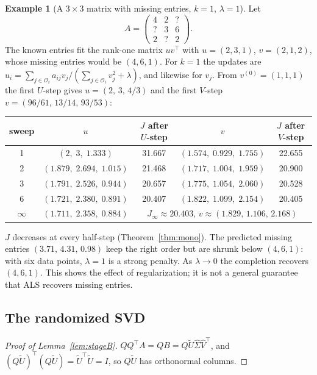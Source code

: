 \documentclass[10pt]{article}
\theoremstyle{plain}
\theoremstyle{definition}
\newtheorem{example}[theorem]{Example}
\theoremstyle{remark}
\newcommand{\T}{^{\top}}
\newcommand{\obs}{\mathcal{O}}
\begin{document}
\begin{example}[A $3\times3$ matrix with missing entries, $k=1$, $\lambda=1$]\label{ex:als3}
Let
\[
A=\begin{pmatrix}4&2&?\\?&3&6\\2&?&2\end{pmatrix}.
\]
The known entries fit the rank-one matrix $uv\T$ with $u=(2,3,1)$, $v=(2,1,2)$, whose missing entries would be $(4,6,1)$. For $k=1$ the updates are $u_i=\sum_{j\in\obs_i}a_{ij}v_j/(\sum_{j\in\obs_i}v_j^2+\lambda)$, and likewise for $v_j$. From $v^{(0)}=(1,1,1)$ the first $U$-step gives $u=(2,\,3,\,4/3)$ and the first $V$-step $v=(96/61,\,13/14,\,93/53)$:
\begin{center}\small
\begin{tabular}{c c c c c}
\toprule
sweep & $u$ & $J$ after $U$-step & $v$ & $J$ after $V$-step\\
\midrule
1 & $(2,\;3,\;1.333)$ & 31.667 & $(1.574,\;0.929,\;1.755)$ & 22.655\\
2 & $(1.879,\;2.694,\;1.015)$ & 21.468 & $(1.717,\;1.004,\;1.959)$ & 20.900\\
3 & $(1.791,\;2.526,\;0.944)$ & 20.657 & $(1.775,\;1.054,\;2.060)$ & 20.528\\
6 & $(1.721,\;2.380,\;0.891)$ & 20.407 & $(1.822,\;1.099,\;2.154)$ & 20.405\\
$\infty$ & $(1.711,\;2.358,\;0.884)$ & \multicolumn{3}{c}{$J_\infty\approx20.403$, $v\approx(1.829,\,1.106,\,2.168)$}\\
\bottomrule
\end{tabular}
\end{center}
$J$ decreases at every half-step (Theorem~\ref{thm:mono}). The predicted missing entries $(3.71,\,4.31,\,0.98)$ keep the right order but are shrunk below $(4,6,1)$: with six data points, $\lambda=1$ is a strong penalty. As $\lambda\to0$ the completion recovers $(4,6,1)$. This shows the effect of regularization; it is not a general guarantee that ALS recovers missing entries.
\end{example}

\subsection{The randomized SVD}

\begin{proof}[Proof of Lemma~\ref{lem:stageB}]
$QQ\T A=QB=Q\tilde U\hat\Sigma\hat V\T$, and $(Q\tilde U)\T(Q\tilde U)=\tilde U\T\tilde U=I$, so $Q\tilde U$ has orthonormal columns.
\end{proof}
\end{document}
